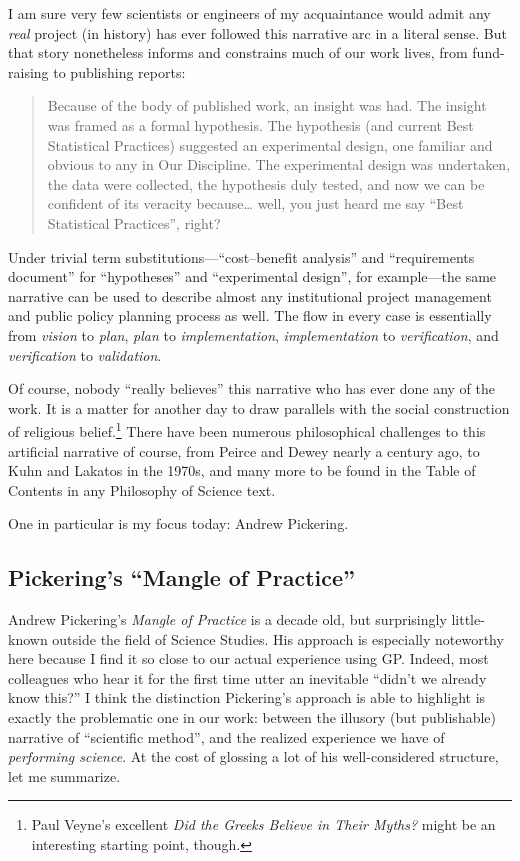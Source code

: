I am sure very few scientists or engineers of my acquaintance would admit any \emph{real} project (in history) has ever followed this narrative arc in a literal sense. But that story nonetheless informs and constrains much of our work lives, from fund-raising to publishing reports:

\begin{quote}
Because of the body of published work, an insight was had. The insight was framed as a formal hypothesis. The hypothesis (and current Best Statistical Practices) suggested an experimental design, one familiar and obvious to any in Our Discipline. The experimental design was undertaken, the data were collected, the hypothesis duly tested, and now we can be confident of its veracity because\ldots{} well, you just heard me say ``Best Statistical Practices'', right?
\end{quote}

Under trivial term substitutions---``cost--benefit analysis'' and ``requirements document'' for ``hypotheses'' and ``experimental design'', for example---the same narrative can be used to describe almost any institutional project management and public policy planning process as well. The flow in every case is essentially from \emph{vision} to \emph{plan}, \emph{plan} to \emph{implementation}, \emph{implementation} to \emph{verification}, and \emph{verification} to \emph{validation}.

Of course, nobody ``really believes'' this narrative who has ever done any of the work. It is a matter for another day to draw parallels with the social construction of religious belief.\footnote{Paul Veyne's excellent \emph{Did the Greeks Believe in Their Myths?} might be an interesting starting point, though.} There have been numerous philosophical challenges to this artificial narrative of course, from Peirce and Dewey nearly a century ago, to Kuhn and Lakatos in the 1970s, and many more to be found in the Table of Contents in any Philosophy of Science text.

One in particular is my focus today: Andrew Pickering.

\subsection{Pickering's ``Mangle of Practice''}\hypertarget{pickerings-mangle-of-practice}{}\label{pickerings-mangle-of-practice}

Andrew Pickering's \emph{Mangle of Practice} is a decade old, but surprisingly little-known outside the field of Science Studies. His approach is especially noteworthy here because I find it so close to our actual experience using GP. Indeed, most colleagues who hear it for the first time utter an inevitable ``didn't we already know this?'' I think the distinction Pickering's approach is able to highlight is exactly the problematic one in our work: between the illusory (but publishable) narrative of ``scientific method'', and the realized experience we have of \emph{performing science}. At the cost of glossing a lot of his well-considered structure, let me summarize.

